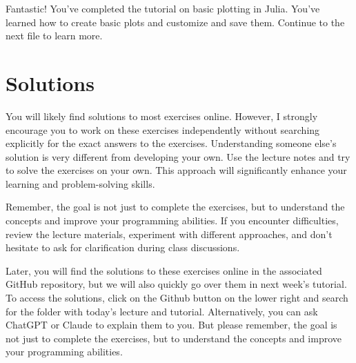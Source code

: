 \documentclass[
]{report}
\begin{document}
Fantastic! You've completed the tutorial on basic plotting in Julia.
You've learned how to create basic plots and customize and save them.
Continue to the next file to learn more.

\chapter{Solutions}\label{solutions}

You will likely find solutions to most exercises online. However, I
strongly encourage you to work on these exercises independently without
searching explicitly for the exact answers to the exercises.
Understanding someone else's solution is very different from developing
your own. Use the lecture notes and try to solve the exercises on your
own. This approach will significantly enhance your learning and
problem-solving skills.

Remember, the goal is not just to complete the exercises, but to
understand the concepts and improve your programming abilities. If you
encounter difficulties, review the lecture materials, experiment with
different approaches, and don't hesitate to ask for clarification during
class discussions.

Later, you will find the solutions to these exercises online in the
associated GitHub repository, but we will also quickly go over them in
next week's tutorial. To access the solutions, click on the Github
button on the lower right and search for the folder with today's lecture
and tutorial. Alternatively, you can ask ChatGPT or Claude to explain
them to you. But please remember, the goal is not just to complete the
exercises, but to understand the concepts and improve your programming
abilities.
\end{document}
